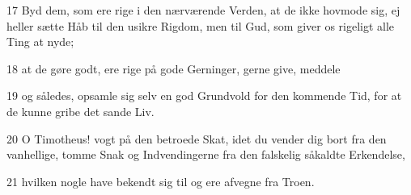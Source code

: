\par 17 Byd dem, som ere rige i den nærværende Verden, at de ikke hovmode sig, ej heller sætte Håb til den usikre Rigdom, men til Gud, som giver os rigeligt alle Ting at nyde;
\par 18 at de gøre godt, ere rige på gode Gerninger, gerne give, meddele
\par 19 og således, opsamle sig selv en god Grundvold for den kommende Tid, for at de kunne gribe det sande Liv.
\par 20 O Timotheus! vogt på den betroede Skat, idet du vender dig bort fra den vanhellige, tomme Snak og Indvendingerne fra den falskelig såkaldte Erkendelse,
\par 21 hvilken nogle have bekendt sig til og ere afvegne fra Troen.


